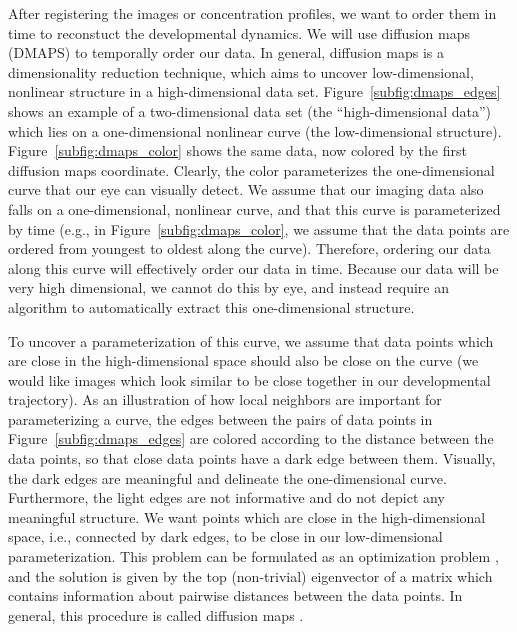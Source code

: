 \documentclass{pnastwo}
\begin{document}
\begin{article}
After registering the images or concentration profiles, we want to order them in time to reconstuct the developmental dynamics. 
%
We will use diffusion maps (DMAPS) \cite{coifman2005geometric} to temporally order our data.
%
In general, diffusion maps is a dimensionality reduction technique, which aims to uncover low-dimensional, nonlinear structure in a high-dimensional data set. 
%
Figure~\ref{subfig:dmaps_edges} shows an example of a two-dimensional data set (the ``high-dimensional data'') which lies on a one-dimensional nonlinear curve (the low-dimensional structure).
%
Figure~\ref{subfig:dmaps_color} shows the same data, now colored by the first diffusion maps coordinate.
%
Clearly, the color parameterizes the one-dimensional curve that our eye can visually detect.
%
We assume that our imaging data also falls on a one-dimensional, nonlinear curve, and that this curve is parameterized by time (e.g., in Figure~\ref{subfig:dmaps_color}, we assume that the data points are ordered from youngest to oldest along the curve). 
%
Therefore, ordering our data along this curve will effectively order our data in time.
%
Because our data will be very high dimensional, we cannot do this by eye, and instead require an algorithm to automatically extract this one-dimensional structure.

To uncover a parameterization of this curve, we assume that data points which are close in the high-dimensional space should also be close on the curve (we would like images which look similar to be close together in our developmental trajectory).
%
%
As an illustration of how local neighbors are important for parameterizing a curve, the edges between the pairs of data points in Figure~\ref{subfig:dmaps_edges} are colored according to the distance between the data points, so that close data points have a dark edge between them.
%
Visually, the dark edges are meaningful and delineate the one-dimensional curve.
%
Furthermore, the light edges are not informative and do not depict any meaningful structure. 
%
We want points which are close in the high-dimensional space, i.e., connected by dark edges, to be close in our low-dimensional parameterization.
%
This problem can be formulated as an optimization problem \cite{Belkin2003}, and the solution is given by the top (non-trivial) eigenvector of a matrix which contains information about pairwise distances between the data points. 
%
In general, this procedure is called diffusion maps \cite{coifman2005geometric}.%


\end{article}
\end{document}

